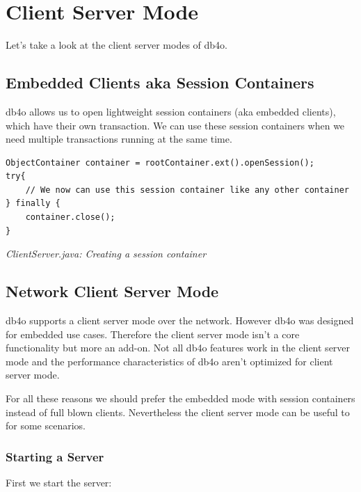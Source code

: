 
\chapter{Client Server Mode}
\label{tut:client-server}

Let's take a look at the client server modes of db4o.

\section{Embedded Clients aka Session Containers}
\label{tut:client-server:sessioncontainers}

db4o allows us to open lightweight session containers (aka embedded clients), which have their own transaction. We can use these session containers when we need multiple transactions running at the same time.

\begin{lstlisting}
ObjectContainer container = rootContainer.ext().openSession();
try{
    // We now can use this session container like any other container
} finally {
    container.close();
}
\end{lstlisting}

{\small\itshape ClientServer.java: Creating a session container\par}
\medskip

\section{Network Client Server Mode}
\label{tut:client-server:networkcs}

db4o supports a client server mode over the network. However db4o was designed for embedded use cases. Therefore the client server mode isn't a core functionality but more an add-on. Not all db4o features work in the client server mode and the performance characteristics of db4o aren't optimized for client server mode.

For all these reasons we should prefer the embedded mode with session containers instead of full blown clients. Nevertheless the client server mode can be useful to for some scenarios.

\subsection*{Starting a Server}

First we start the server:

